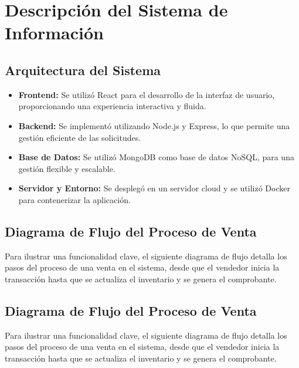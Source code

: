 \documentclass[conference]{IEEEtran}
\begin{document}
\section{Descripción del Sistema de Información}
\subsection{Arquitectura del Sistema}
\begin{itemize}
    \item \textbf{Frontend:} Se utilizó React para el desarrollo de la interfaz de usuario, proporcionando una experiencia interactiva y fluida.
    \item \textbf{Backend:} Se implementó utilizando Node.js y Express, lo que permite una gestión eficiente de las solicitudes.
    \item \textbf{Base de Datos:} Se utilizó MongoDB como base de datos NoSQL, para una gestión flexible y escalable.
    \item \textbf{Servidor y Entorno:} Se desplegó en un servidor cloud y se utilizó Docker para contenerizar la aplicación.
\end{itemize}

\subsection{Diagrama de Flujo del Proceso de Venta}
Para ilustrar una funcionalidad clave, el siguiente diagrama de flujo detalla los pasos del proceso de una venta en el sistema, desde que el vendedor inicia la transacción hasta que se actualiza el inventario y se genera el comprobante.

\subsection{Diagrama de Flujo del Proceso de Venta}
Para ilustrar una funcionalidad clave, el siguiente diagrama de flujo detalla los pasos del proceso de una venta en el sistema, desde que el vendedor inicia la transacción hasta que se actualiza el inventario y se genera el comprobante.
\end{document}
